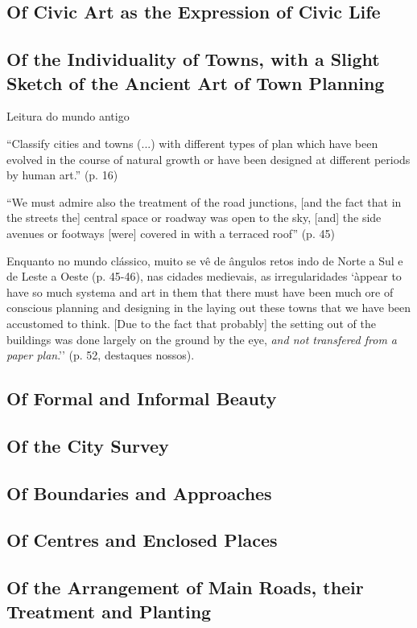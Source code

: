 \documentclass[12pt, a4paper]{book} %
\begin{document}
        \subsection*{Of Civic Art as the Expression of Civic Life}
        \subsection*{Of the Individuality of Towns, with a Slight Sketch of the Ancient Art of Town Planning}

        Leitura do mundo antigo

        ``Classify cities and towns (...) with different types of plan which have been evolved in the course of natural growth or have been designed at different periods by human art.'' (p. 16)

        ``We must admire also the treatment of the road junctions, [and the fact that in the streets the] central space or roadway was open to the sky, [and] the side avenues or footways [were] covered in with a terraced roof'' (p. 45)

        Enquanto no mundo clássico, muito se vê de ângulos retos indo de Norte a Sul e de Leste a Oeste (p. 45-46), nas cidades medievais, as irregularidades `àppear to have so much systema and art in them that there must have been much ore of conscious planning and designing in the laying out these towns that we have been accustomed to think. [Due to the fact that probably] the setting out of the buildings was done largely on the ground by the eye, \textit{and not transfered from a paper plan}.'' (p. 52, destaques nossos).

        \subsection*{Of Formal and Informal Beauty}
        \subsection*{Of the City Survey}
        \subsection*{Of Boundaries and Approaches}
        \subsection*{Of Centres and Enclosed Places}
        \subsection*{Of the Arrangement of Main Roads, their Treatment and Planting}
\end{document}
